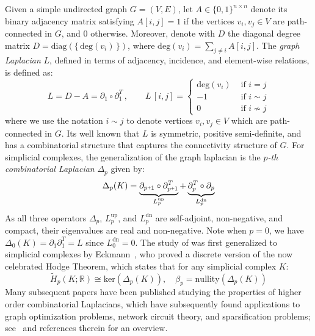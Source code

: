 \documentclass[10pt]{article}
\numberwithin{equation}{section}
\newcommand{\+}{%
	\raisebox{0.18ex}{\scaleobj{0.55}{+}}
}
\theoremstyle{definition}
\begin{document}
Given a simple undirected graph $G = (V, E)$, let $A \in \{0,1\}^{n \times n}$ denote its binary adjacency matrix satisfying $A[i,j] = 1$ if the vertices $v_i,v_j \in V$ are path-connected in $G$, and $0$ otherwise. Moreover, denote with $D$ the diagonal degree matrix $D = \mathrm{diag}(\{ \, \mathrm{deg}(v_i) \, \})$, where $\mathrm{deg}(v_i) = \sum_{j \neq i} A[i,j]$.
The \emph{graph Laplacian} $L$, defined in terms of adjacency, incidence, and element-wise relations, is defined as: 
\begin{equation}
L = D - A = \partial_1 \circ \partial_1^T \, , \quad\quad
	L\,[i,j] = \begin{cases}
		\mathrm{deg}(v_i) & \text{ if } i = j \\
		-1 & \text{ if } i \sim j \\
		0 & \text{ if } i \nsim j
	\end{cases}
\end{equation}
where we use the notation $i \sim j$ to denote vertices $v_i,v_j \in V$ which are path-connected in $G$. 
Its well known that $L$ is symmetric, positive semi-definite, and has a combinatorial structure that captures the connectivity structure of $G$. 
For simplicial complexes, the generalization of the graph laplacian is the \emph{$p$-th combinatorial Laplacian} $\Delta_p$ given by: 
\begin{equation}
	\Delta_p(K) = 
	\underbrace{\partial_{p\+1} \circ \partial_{p\+1}^T}_{L_p^{\text{up}}} + \underbrace{\partial_{p}^T  \circ  \partial_{p}}_{L_p^{\text{dn}}} 
\end{equation}
As all three operators $\Delta_p$, $L_p^{\text{up}}$, and $L_p^{\text{dn}}$ are self-adjoint, non-negative, and compact, their eigenvalues are real and non-negative.
Note when $p = 0$, we have $\Delta_0(K) = \partial_1 \partial_1^T = L$ since $L_0^{\text{dn}} = 0$.
The study of was first generalized to simplicial complexes by Eckmann~\cite{}, who proved a discrete version of the now celebrated Hodge Theorem, which states that for any simplicial complex $K$: 
\begin{equation}\label{eq:laplace_hom}
	\tilde{H}_p(K; \mathbb{R}) \cong \mathrm{ker}(\Delta_p(K)), \quad \beta_p = \mathrm{nullity}(\Delta_p(K))
\end{equation}
Many subsequent papers have been published studying the properties of higher order combinatorial Laplacians, which have subsequently found applications to graph optimization problems, network circuit theory, and sparsification problems; see~\cite{} and references therein for an overview. 
\end{document}
